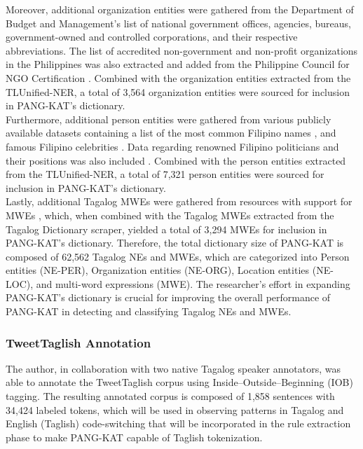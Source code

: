\documentclass[journal]{./IEEE/IEEEtran}
\begin{document}
Moreover, additional organization entities were gathered from the Department of Budget and Management’s {\cite{DBM-OCIO}}{\cite{OrgAcronyms}} list of national government offices, agencies, bureaus, government-owned and controlled corporations, and their respective abbreviations. The list of accredited non-government and non-profit organizations in the Philippines was also extracted and added from the Philippine Council for NGO Certification {\cite{NGO}}. Combined with the organization entities extracted from the TLUnified-NER, a total of 3,564 organization entities were sourced for inclusion in PANG-KAT’s dictionary. \\

Furthermore, additional person entities were gathered from various publicly available datasets containing a list of the most common Filipino names {\cite{nameDatabase}} {\cite{popNameDatabase}}, and famous Filipino celebrities {\cite{filCelebs}}. Data regarding renowned Filipino politicians and their positions was also included {\cite{worldLeaders}} {\cite{Senators}}. Combined with the person entities extracted from the TLUnified-NER, a total of 7,321 person entities were sourced for inclusion in PANG-KAT’s dictionary. \\

Lastly, additional Tagalog MWEs were gathered from resources with support for MWEs {\cite{KWFManwal}}, which, when combined with the Tagalog MWEs extracted from the Tagalog Dictionary scraper, yielded a total of 3,294 MWEs for inclusion in PANG-KAT’s dictionary. Therefore, the total dictionary size of PANG-KAT is composed of 62,562 Tagalog NEs and MWEs, which are categorized into Person entities (NE-PER), Organization entities (NE-ORG), Location entities (NE-LOC), and multi-word expressions (MWE). The researcher’s effort in expanding PANG-KAT’s dictionary is crucial for improving the overall performance of PANG-KAT in detecting and classifying Tagalog NEs and MWEs. \\

\subsubsection{TweetTaglish Annotation}

The author, in collaboration with two native Tagalog speaker annotators, was able to annotate the TweetTaglish corpus using Inside–Outside–Beginning (IOB) tagging. The resulting annotated corpus is composed of 1,858 sentences with 34,424 labeled tokens, which will be used in observing patterns in Tagalog and English (Taglish) code-switching that will be incorporated in the rule extraction phase to make PANG-KAT capable of Taglish tokenization. \\
\end{document}

